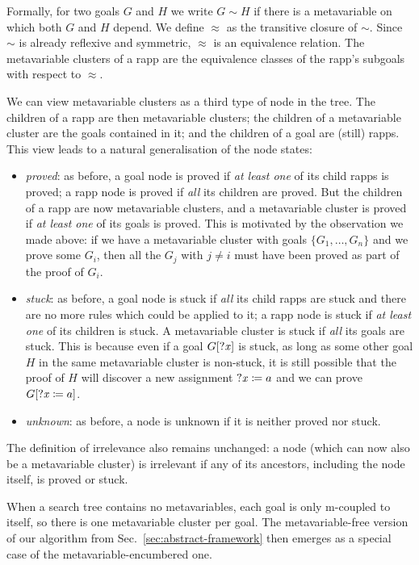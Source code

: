 Formally, for two goals $G$ and $H$ we write $G \sim H$ if there is a metavariable on which both $G$ and $H$ depend.
We define $\approx$ as the transitive closure of $\sim$.
Since $\sim$ is already reflexive and symmetric, $\approx$ is an equivalence relation.
The metavariable clusters of a rapp are the equivalence classes of the rapp's subgoals with respect to $\approx$.

We can view metavariable clusters as a third type of node in the tree.
The children of a rapp are then metavariable clusters; the children of a metavariable cluster are the goals contained in it; and the children of a goal are (still) rapps.
This view leads to a natural generalisation of the node states:
\begin{itemize}
  \item
    \emph{proved}: as before, a goal node is proved if \emph{at least one} of its child rapps is proved; a rapp node is proved if \emph{all} its children are proved.
    But the children of a rapp are now metavariable clusters, and a metavariable cluster is proved if \emph{at least one} of its goals is proved.
    This is motivated by the observation we made above: if we have a metavariable cluster with goals $\{ G_{1}, \dots, G_{n}\}$ and we prove some $G_{i}$, then all the $G_{j}$ with $j ≠ i$ must have been proved as part of the proof of $G_{i}$.
  \item \emph{stuck}: as before, a goal node is stuck if \emph{all} its child rapps are stuck and there are no more rules which could be applied to it; a rapp node is stuck if \emph{at least one} of its children is stuck.
    A metavariable cluster is stuck if \emph{all} its goals are stuck.
    This is because even if a goal $G[\mathit{?x}]$ is stuck, as long as some other goal $H$ in the same metavariable cluster is non-stuck, it is still possible that the proof of $H$ will discover a new assignment $\mathit{?x} \coloneqq a$ and we can prove $G[\mathit{?x} \coloneqq a]$.
  \item
    \emph{unknown}: as before, a node is unknown if it is neither proved nor stuck.
\end{itemize}
The definition of irrelevance also remains unchanged: a node (which can now also be a metavariable cluster) is irrelevant if any of its ancestors, including the node itself, is proved or stuck.

When a search tree contains no metavariables, each goal is only m-coupled to itself, so there is one metavariable cluster per goal.
The metavariable-free version of our algorithm from Sec.~\ref{sec:abstract-framework} then emerges as a special case of the metavariable-encumbered one.


